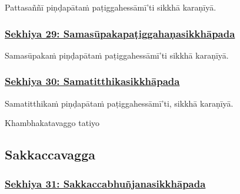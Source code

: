 Pattasaññī piṇḍapātaṁ paṭiggahessāmī'ti sikkhā karaṇīyā.



\subsubsection*{\hyperref[training29]{Sekhiya 29: Samasūpakapaṭiggahaṇasikkhāpada}}
\label{sekh29}

Samasūpakaṁ piṇḍapātaṁ paṭiggahessāmī'ti sikkhā karaṇīyā.



\subsubsection*{\hyperref[training30]{Sekhiya 30: Samatitthikasikkhāpada}}
\label{sekh30}

Samatitthikaṁ\makeatletter\hyperlink{endnote480-appendix}\makeatother{} piṇḍapātaṁ paṭiggahessāmī'ti, sikkhā karaṇīyā.

\begin{center}
	Khambhakatavaggo\makeatletter\hyperlink{endnote481-appendix}\makeatother{} tatiyo\makeatletter\hyperlink{endnote482-appendix}\makeatother{}
\end{center}



\subsection{Sakkaccavagga}
\label{sekh-vagga4}

\subsubsection*{\hyperref[training31]{Sekhiya 31: Sakkaccabhuñjanasikkhāpada}}
\label{sekh31}

